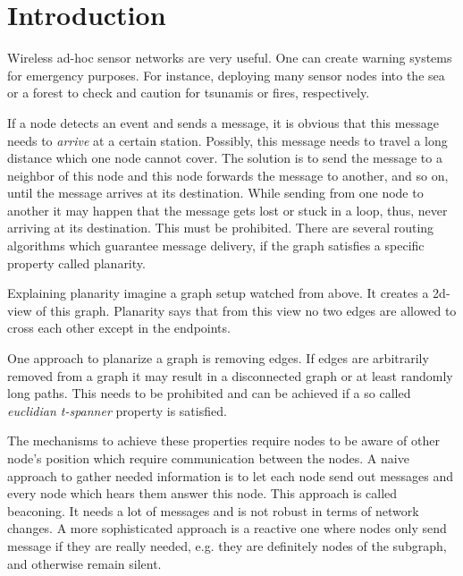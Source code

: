 \section{Introduction}
Wireless ad-hoc sensor networks are very useful. 
One can create warning systems for emergency purposes.
For instance, deploying many sensor nodes into the sea or a forest to check and caution for tsunamis or fires, respectively.

If a node detects an event and sends a message, it is obvious that this message needs to \emph{arrive} at a certain station.
Possibly, this message needs to travel a long distance which one node cannot cover.
The solution is to send the message to a neighbor of this node and this node forwards the message to another, and so on, until the message arrives at its destination.
While sending from one node to another it may happen that the message gets lost or stuck in a loop, thus, never arriving at its destination.
This must be prohibited.
There are several routing algorithms which guarantee message delivery, if the graph satisfies a specific property called planarity.

Explaining planarity imagine a graph setup watched from above. 
It creates a 2d-view of this graph.
Planarity says that from this view no two edges are allowed to cross each other except in the endpoints.

One approach to planarize a graph is removing edges.
If edges are arbitrarily removed from a graph it may result in a disconnected graph or at least randomly long paths.
This needs to be prohibited and can be achieved if a so called \emph{euclidian t-spanner} property is satisfied.

The mechanisms to achieve these properties require nodes to be aware of other node's position which require communication between the nodes.
A naive approach to gather needed information is to let each node send out messages and every node which hears them answer this node.
This approach is called beaconing.
It needs a lot of messages and is not robust in terms of network changes.
A more sophisticated approach is a reactive one where nodes only send message if they are really needed, e.g. they are definitely nodes of the subgraph, and otherwise remain silent. 

